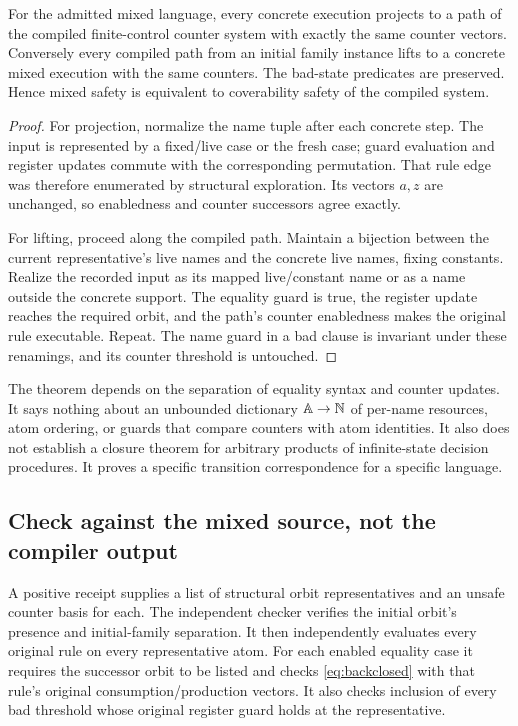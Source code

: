 \begin{theorem}
\label{thm:product}
For the admitted mixed language, every concrete execution projects to a path
of the compiled finite-control counter system with exactly the same counter
vectors. Conversely every compiled path from an initial family instance lifts
to a concrete mixed execution with the same counters. The bad-state predicates
are preserved. Hence mixed safety is equivalent to coverability safety of the
compiled system.
\end{theorem}
\begin{proof}
For projection, normalize the name tuple after each concrete step. The input
is represented by a fixed/live case or the fresh case; guard evaluation and
register updates commute with the corresponding permutation. That rule edge
was therefore enumerated by structural exploration. Its vectors $a,z$ are
unchanged, so enabledness and counter successors agree exactly.

For lifting, proceed along the compiled path. Maintain a bijection between
the current representative's live names and the concrete live names, fixing
constants. Realize the recorded input as its mapped live/constant name or as
a name outside the concrete support. The equality guard is true, the register
update reaches the required orbit, and the path's counter enabledness makes
the original rule executable. Repeat. The name guard in a bad clause is
invariant under these renamings, and its counter threshold is untouched.
\end{proof}

The theorem depends on the separation of equality syntax and counter updates.
It says nothing about an unbounded dictionary $\mathbb A\to\mathbb N$ of per-name
resources, atom ordering, or guards that compare counters with atom identities.
It also does not establish a closure theorem for arbitrary products of
infinite-state decision procedures. It proves a specific transition
correspondence for a specific language.

\subsection{Check against the mixed source, not the compiler output}
A positive receipt supplies a list of structural orbit representatives and an
unsafe counter basis for each. The independent checker verifies the initial
orbit's presence and initial-family separation. It then independently evaluates
every original rule on every representative atom. For each enabled equality
case it requires the successor orbit to be listed and checks
\eqref{eq:backclosed} with that rule's original consumption/production vectors.
It also checks inclusion of every bad threshold whose original register guard
holds at the representative.

